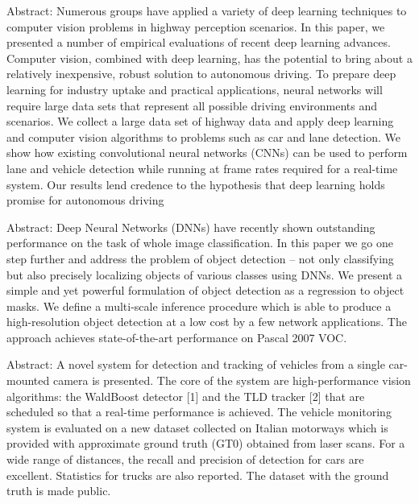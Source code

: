\documentclass[letterpaper, 10 pt, conference]{ieeeconf}  %
\begin{document}
Abstract:
    Numerous groups have applied a variety of deep learning techniques to computer vision problems in highway perception scenarios. In this paper, we presented a number of empirical evaluations of recent deep learning advances. Computer vision, combined with deep learning, has the potential to bring about a relatively inexpensive, robust solution to autonomous driving. To prepare deep learning for industry uptake and practical applications, neural networks will require large data sets that represent all possible driving environments and scenarios. We collect a large data set of highway data and apply deep learning and computer vision algorithms to problems such as car and lane detection. We show how existing convolutional neural networks (CNNs) can be used to perform lane and vehicle detection while running at frame rates required for a real-time system. Our results lend credence to the hypothesis that deep learning holds promise for autonomous driving\cite{DBLP:journals/corr/HuvalWTKSPARMCM15}

Abstract:
    Deep Neural Networks (DNNs) have recently shown outstanding performance on the task of whole image classification. In this paper we go one step further and address the problem of object detection -- not only classifying but also precisely localizing objects of various classes using DNNs. We present a simple and yet powerful formulation of object detection as a regression to object masks. We define a multi-scale inference procedure which is able to produce a high-resolution object detection at a low cost by a few network applications. The approach achieves state-of-the-art performance on Pascal 2007 VOC.\cite{NIPS2013_5207}

Abstract:
    A novel system for detection and tracking of vehicles from a single car-mounted camera is presented. The core of the system are high-performance vision algorithms: the WaldBoost detector [1] and the TLD tracker [2] that are scheduled so that a real-time performance is achieved. The vehicle monitoring system is evaluated on a new dataset collected on Italian motorways which is provided with approximate ground truth (GT0) obtained from laser scans. For a wide range of distances, the recall and precision of detection for cars are excellent. Statistics for trucks are also reported. The dataset with the ground truth is made public.\cite{6338748}

\end{document}
